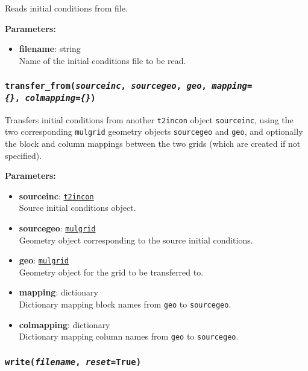 Reads initial conditions from file.

\textbf{Parameters:}
\begin{itemize}
\item \textbf{filename}: string\\
  Name of the initial conditions file to be read.
\end{itemize}

\begin{snugshade}
\subsubsection{\texttt{transfer\_from(\emph{sourceinc}, \emph{sourcegeo}, \emph{geo}, \emph{mapping=\{\}},\
    \emph{colmapping=\{\}})}}
\end{snugshade}
\label{sec:t2incon:transfer_from}

Transfers initial conditions from another \texttt{t2incon} object \texttt{sourceinc}, using the two corresponding \texttt{mulgrid} geometry objects \texttt{sourcegeo} and \texttt{geo}, and optionally the block and column mappings between the two grids (which are created if not specified).

\textbf{Parameters:}
\begin{itemize}
\item \textbf{sourceinc}: \hyperref[incons]{\texttt{t2incon}}\\
  Source initial conditions object.
\item \textbf{sourcegeo}: \hyperref[mulgrids]{\texttt{mulgrid}}\\
  Geometry object corresponding to the source initial conditions.
\item \textbf{geo}: \hyperref[mulgrids]{\texttt{mulgrid}}\\
  Geometry object for the grid to be transferred to.
\item \textbf{mapping}: dictionary\\
  Dictionary mapping block names from \texttt{geo} to \texttt{sourcegeo}.
\item \textbf{colmapping}: dictionary\\
  Dictionary mapping column names from \texttt{geo} to \texttt{sourcegeo}.
\end{itemize}

\begin{snugshade}
\subsubsection{\texttt{write(\emph{filename}, \emph{reset}=True)}}
\end{snugshade}
\label{sec:t2incon:write}

